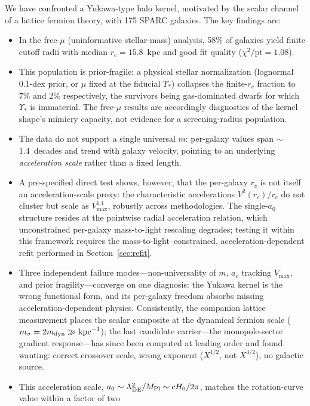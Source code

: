 \documentclass[11pt,a4paper]{article}
\begin{document}
We have confronted a Yukawa-type halo kernel, motivated by the
scalar channel of a lattice fermion theory, with 175 SPARC
galaxies.
The key findings are:
\begin{itemize}
\item In the free-$\mu$ (uninformative stellar-mass) analysis,
  58\% of galaxies yield finite cutoff radii with median
  $r_c = 15.8$~kpc and good fit quality ($\chi^2/\mathrm{pt} = 1.08$).
\item This population is prior-fragile: a physical stellar
  normalization (lognormal 0.1-dex prior, or $\mu$ fixed at the
  fiducial $\Upsilon_*$) collapses the finite-$r_c$ fraction to
  7\% and 2\% respectively, the survivors being gas-dominated
  dwarfs for which $\Upsilon_*$ is immaterial.  The free-$\mu$
  results are accordingly diagnostics of the kernel shape's
  mimicry capacity, not evidence for a screening-radius
  population.
\item The data do not support a single universal $m$: per-galaxy
  values span $\sim$1.4~decades and trend with galaxy velocity,
  pointing to an underlying \emph{acceleration scale} rather than a
  fixed length.
\item A pre-specified direct test shows, however, that the
  per-galaxy $r_c$ is not itself an acceleration-scale proxy: the
  characteristic accelerations $V^2(r_c)/r_c$ do not cluster but
  scale as $V_{\max}^{1.1}$, robustly across methodologies.  The
  single-$a_0$ structure resides at the pointwise radial
  acceleration relation, which unconstrained per-galaxy
  mass-to-light rescaling degrades; testing it within this
  framework requires the mass-to-light--constrained,
  acceleration-dependent refit performed in
  Section~\ref{sec:refit}.
\item Three independent failure modes---non-universality of $m$,
  $a_c$ tracking $V_{\max}$, and prior fragility---converge on one
  diagnosis: the Yukawa kernel is the wrong functional form, and
  its per-galaxy freedom absorbs missing acceleration-dependent
  physics.  Consistently, the companion lattice measurement places
  the scalar composite at the dynamical fermion scale
  ($m_\sigma = 2m_{\rm dyn} \gg \mathrm{kpc}^{-1}$); the last
  candidate carrier---the monopole-sector gradient response---has
  since been computed at leading order and found wanting: correct
  crossover scale, wrong exponent ($X^{1/2}$, not $X^{3/2}$), no
  galactic source.
\item This acceleration scale, $a_0 \sim \Lambda_{\rm DE}^2/M_{\rm Pl}
  \sim cH_0/2\pi$, matches the rotation-curve value within a factor of two

\end{itemize}
\end{document}

